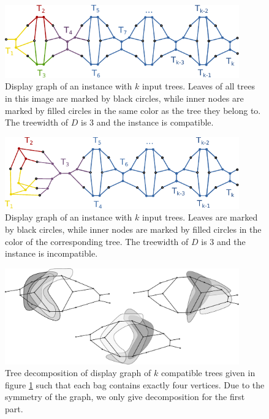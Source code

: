 \begin{figure}[h]
	\centering
		\includegraphics[width=0.9\textwidth]{../figs/ch5/gray_comp_ref_tw3.pdf}
		\caption{Display graph of an instance with $k$ input trees. Leaves of all trees in this image are marked by black circles, while inner nodes are marked by filled circles in the same color as the tree they belong to. The treewidth of $D$ is 3 and the instance is compatible.}
	\label{fig:gray_comp_tw3}
\end{figure}

\begin{figure}[h]
	\centering
		\includegraphics[width=0.9\textwidth]{../figs/ch5/gray_incomp_ref_tw3.pdf}
	\caption{Display graph of an instance with $k$ input trees. Leaves are marked by black circles, while inner nodes are marked by filled circles in the color of the corresponding tree. The treewidth of $D$ is 3 and the instance is incompatible.}
	\label{fig:gray_incomp_tw3}
\end{figure}

\begin{figure}[h]
	\centering
		\includegraphics[width=0.9\textwidth]{../figs/ch5/decomp_comp.pdf}
	\caption{Tree decomposition of display graph of $k$ compatible trees given in figure \ref{fig:gray_comp_tw3} such that each bag contains exactly four vertices. Due to the symmetry of the graph, we only give decomposition for the first part.}
	\label{fig:decomp}
\end{figure}

